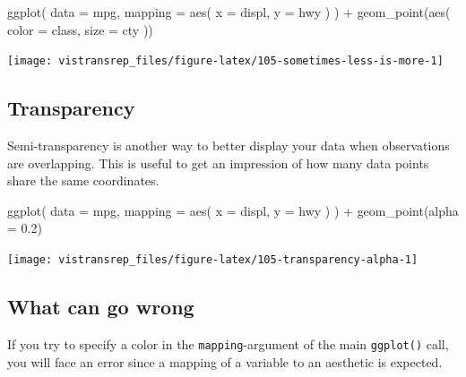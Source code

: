 \documentclass[]{book}
\newenvironment{Shaded}{}{}
\newcommand{\DataTypeTok}[1]{#1}
\newcommand{\FloatTok}[1]{#1}
\newcommand{\KeywordTok}[1]{\textcolor[rgb]{0.00,0.00,1.00}{#1}}
\newcommand{\NormalTok}[1]{#1}
\newcommand{\OperatorTok}[1]{#1}
\newcommand{\StringTok}[1]{\textcolor[rgb]{0.00,0.50,0.50}{#1}}
\begin{document}
\begin{Shaded}
\begin{Highlighting}[]
\KeywordTok{ggplot}\NormalTok{(}
  \DataTypeTok{data =}\NormalTok{ mpg,}
  \DataTypeTok{mapping =} \KeywordTok{aes}\NormalTok{(}
    \DataTypeTok{x =}\NormalTok{ displ,}
    \DataTypeTok{y =}\NormalTok{ hwy}
\NormalTok{  )}
\NormalTok{) }\OperatorTok{+}
\StringTok{  }\KeywordTok{geom_point}\NormalTok{(}\KeywordTok{aes}\NormalTok{(}
    \DataTypeTok{color =}\NormalTok{ class,}
    \DataTypeTok{size =}\NormalTok{ cty}
\NormalTok{  ))}
\end{Highlighting}
\end{Shaded}

\begin{flushright}\texttt{[image: vistransrep\_files/figure-latex/105-sometimes-less-is-more-1]} \end{flushright}

\hypertarget{transparency}{%
\subsection{Transparency}\label{transparency}}

Semi-transparency is another way to better display your data when observations are overlapping.
This is useful to get an impression of how many data points share the same coordinates.

\begin{Shaded}
\begin{Highlighting}[]
\KeywordTok{ggplot}\NormalTok{(}
  \DataTypeTok{data =}\NormalTok{ mpg,}
  \DataTypeTok{mapping =} \KeywordTok{aes}\NormalTok{(}
    \DataTypeTok{x =}\NormalTok{ displ,}
    \DataTypeTok{y =}\NormalTok{ hwy}
\NormalTok{  )}
\NormalTok{) }\OperatorTok{+}
\StringTok{  }\KeywordTok{geom_point}\NormalTok{(}\DataTypeTok{alpha =} \FloatTok{0.2}\NormalTok{)}
\end{Highlighting}
\end{Shaded}

\begin{flushright}\texttt{[image: vistransrep\_files/figure-latex/105-transparency-alpha-1]} \end{flushright}

\hypertarget{what-can-go-wrong}{%
\subsection{What can go wrong}\label{what-can-go-wrong}}

If you try to specify a color in the \texttt{mapping}-argument of the main \texttt{ggplot()} call, you will face an error since a mapping of a variable to an aesthetic is expected.
\end{document}
